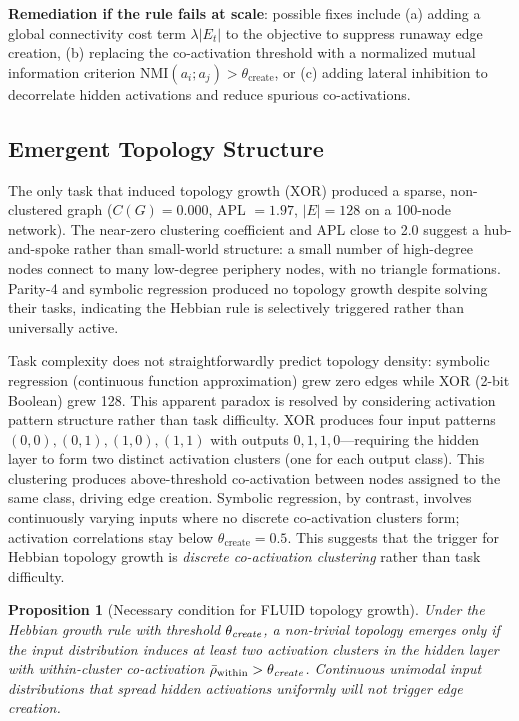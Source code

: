 \documentclass[12pt]{article}
\newtheorem{proposition}{Proposition}
\begin{document}
\textbf{Remediation if the rule fails at scale}: possible fixes include (a) adding a global connectivity cost term $\lambda|E_t|$ to the objective to suppress runaway edge creation, (b) replacing the co-activation threshold with a normalized mutual information criterion $\text{NMI}(a_i; a_j) > \theta_{\text{create}}$, or (c) adding lateral inhibition to decorrelate hidden activations and reduce spurious co-activations.

\subsection{Emergent Topology Structure}

The only task that induced topology growth (XOR) produced a sparse, non-clustered graph ($C(G) = 0.000$, APL $= 1.97$, $|E| = 128$ on a 100-node network). The near-zero clustering coefficient and APL close to 2.0 suggest a hub-and-spoke rather than small-world structure: a small number of high-degree nodes connect to many low-degree periphery nodes, with no triangle formations. Parity-4 and symbolic regression produced no topology growth despite solving their tasks, indicating the Hebbian rule is selectively triggered rather than universally active.

Task complexity does not straightforwardly predict topology density: symbolic regression (continuous function approximation) grew zero edges while XOR (2-bit Boolean) grew 128. This apparent paradox is resolved by considering activation pattern structure rather than task difficulty. XOR produces four input patterns $(0,0), (0,1), (1,0), (1,1)$ with outputs $0,1,1,0$---requiring the hidden layer to form two distinct activation clusters (one for each output class). This clustering produces above-threshold co-activation between nodes assigned to the same class, driving edge creation. Symbolic regression, by contrast, involves continuously varying inputs where no discrete co-activation clusters form; activation correlations stay below $\theta_{\text{create}} = 0.5$. This suggests that the trigger for Hebbian topology growth is \emph{discrete co-activation clustering} rather than task difficulty.

\begin{proposition}[Necessary condition for FLUID topology growth]
Under the Hebbian growth rule with threshold $\theta_{\emph{create}}$, a non-trivial topology emerges only if the input distribution induces at least two activation clusters in the hidden layer with within-cluster co-activation $\bar{\rho}_{\text{within}} > \theta_{\emph{create}}$. Continuous unimodal input distributions that spread hidden activations uniformly will not trigger edge creation.
\end{proposition}
\end{document}

